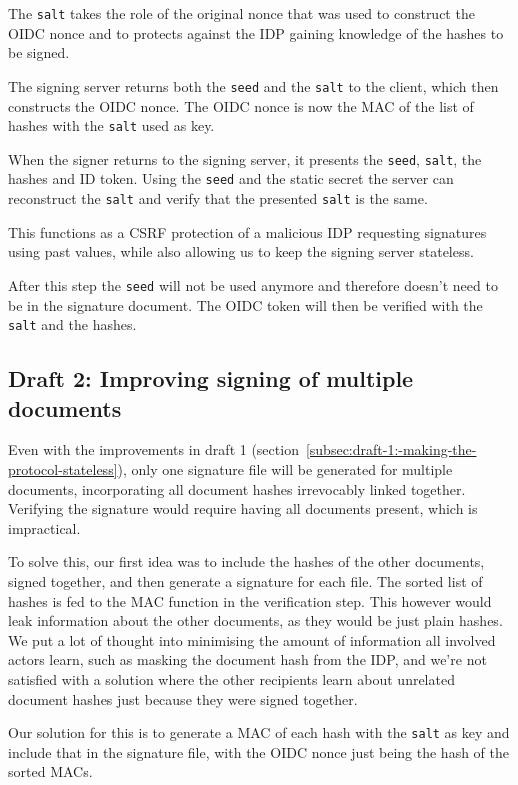 The \texttt{salt} takes the role of the original nonce that was used to construct the \gls{OIDC} nonce and to protects against the \gls{IDP} gaining knowledge of the hashes to be signed.

The signing server returns both the \texttt{seed} and the \texttt{salt} to the client,
which then constructs the \gls{OIDC} nonce.
The \gls{OIDC} nonce is now the \gls{MAC} of the list of hashes with the \texttt{salt} used as key.

When the signer returns to the signing server, it presents the \texttt{seed}, \texttt{salt}, the hashes and ID token.
Using the \texttt{seed} and the static secret the server can reconstruct the \texttt{salt} and verify that the presented \texttt{salt} is the same.

This functions as a \gls{CSRF} protection of a malicious \gls{IDP} requesting signatures using past values,
while also allowing us to keep the signing server stateless.

After this step the \texttt{seed} will not be used anymore and therefore doesn't need to be in the signature document.
The \gls{OIDC} token will then be verified with the \texttt{salt} and the hashes.

\subsection{Draft 2: Improving signing of multiple documents}\label{subsec:draft-2:-improving-signing-of-multiple-documents}
Even with the improvements in draft 1 (section~\ref{subsec:draft-1:-making-the-protocol-stateless}),
only one signature file will be generated for multiple documents, incorporating all document hashes irrevocably linked together.
Verifying the signature would require having all documents present, which is impractical.

To solve this, our first idea was to include the hashes of the other documents, signed together,
and then generate a signature for each file.
The sorted list of hashes is fed to the \gls{MAC} function in the verification step.
This however would leak information about the other documents, as they would be just plain hashes.
We put a lot of thought into minimising the amount of information all involved actors learn,
such as masking the document hash from the \gls{IDP}, and we're not satisfied with a solution where the other recipients learn
about unrelated document hashes just because they were signed together.

Our solution for this is to generate a \gls{MAC} of each hash with the \texttt{salt} as key and include that in the signature file,
with the \gls{OIDC} nonce just being the hash of the sorted \gls{MAC}s.

